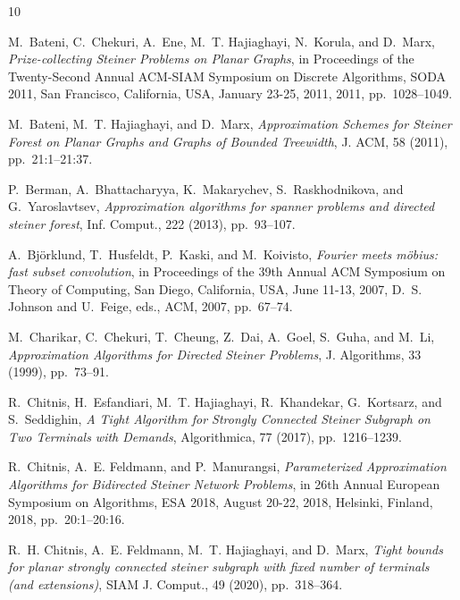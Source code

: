 \documentclass[a4paper,11pt]{article}
\theoremstyle{plain}
\newtheorem{identification rule}{Identification Rule}
\theoremstyle{definition}
\theoremstyle{remark}
\begin{document}
\begin{thebibliography}{10}

{\sc M.~Bateni, C.~Chekuri, A.~Ene, M.~T. Hajiaghayi, N.~Korula, and D.~Marx},
  {\em {Prize-collecting Steiner Problems on Planar Graphs}}, in Proceedings of
  the Twenty-Second Annual {ACM-SIAM} Symposium on Discrete Algorithms, {SODA}
  2011, San Francisco, California, USA, January 23-25, 2011, 2011,
  pp.~1028--1049.

{\sc M.~Bateni, M.~T. Hajiaghayi, and D.~Marx}, {\em {Approximation Schemes for
  Steiner Forest on Planar Graphs and Graphs of Bounded Treewidth}}, J. {ACM},
  58 (2011), pp.~21:1--21:37.

{\sc P.~Berman, A.~Bhattacharyya, K.~Makarychev, S.~Raskhodnikova, and
  G.~Yaroslavtsev}, {\em Approximation algorithms for spanner problems and
  directed steiner forest}, Inf. Comput., 222 (2013), pp.~93--107.

{\sc A.~Bj{\"{o}}rklund, T.~Husfeldt, P.~Kaski, and M.~Koivisto}, {\em Fourier
  meets m{\"{o}}bius: fast subset convolution}, in Proceedings of the 39th
  Annual {ACM} Symposium on Theory of Computing, San Diego, California, USA,
  June 11-13, 2007, D.~S. Johnson and U.~Feige, eds., {ACM}, 2007, pp.~67--74.

{\sc M.~Charikar, C.~Chekuri, T.~Cheung, Z.~Dai, A.~Goel, S.~Guha, and M.~Li},
  {\em {Approximation Algorithms for Directed Steiner Problems}}, J.
  Algorithms, 33 (1999), pp.~73--91.

{\sc R.~Chitnis, H.~Esfandiari, M.~T. Hajiaghayi, R.~Khandekar, G.~Kortsarz,
  and S.~Seddighin}, {\em {A Tight Algorithm for Strongly Connected Steiner
  Subgraph on Two Terminals with Demands}}, Algorithmica, 77 (2017),
  pp.~1216--1239.

{\sc R.~Chitnis, A.~E. Feldmann, and P.~Manurangsi}, {\em {Parameterized
  Approximation Algorithms for Bidirected Steiner Network Problems}}, in 26th
  Annual European Symposium on Algorithms, {ESA} 2018, August 20-22, 2018,
  Helsinki, Finland, 2018, pp.~20:1--20:16.

{\sc R.~H. Chitnis, A.~E. Feldmann, M.~T. Hajiaghayi, and D.~Marx}, {\em Tight
  bounds for planar strongly connected steiner subgraph with fixed number of
  terminals (and extensions)}, {SIAM} J. Comput., 49 (2020), pp.~318--364.


\end{thebibliography}
\end{document}
